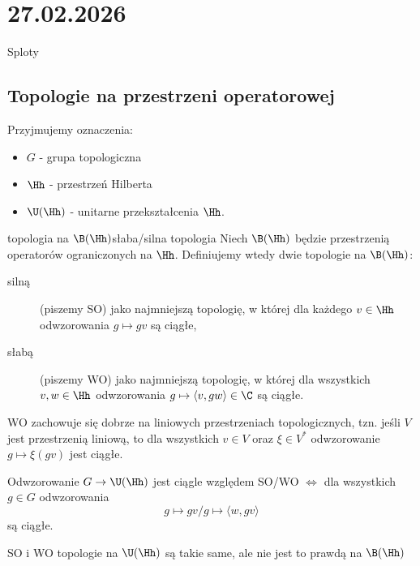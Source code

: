 \section{27.02.2026}{Sploty}

\subsection{Topologie na przestrzeni operatorowej}

Przyjmujemy oznaczenia:
\begin{itemize}
  \item $G$ - grupa topologiczna
  \item $\Hh$ - przestrzeń Hilberta
  \item $\U(\Hh)$ - unitarne przekształcenia $\Hh$.
\end{itemize}

\begin{definition}{topologia na $\B(\Hh)$}{słaba/silna topologia}
  Niech $\B(\Hh)$ będzie przestrzenią operatorów ograniczonych na $\Hh$. Definiujemy wtedy dwie topologie na $\B(\Hh)$:
  \begin{description}
    \item[silną] (piszemy SO) jako najmniejszą topologię, w której dla każdego $v\in\Hh$ odwzorowania $g\mapsto gv$ są ciągłe,
    \item[słabą] (piszemy WO) jako najmniejszą topologię, w której dla wszystkich $v,w\in\Hh$ odwzorowania $g\mapsto \langle v,gw\rangle\in\C$ są ciągłe.
  \end{description}
\end{definition}

WO zachowuje się dobrze na liniowych przestrzeniach topologicznych, tzn. jeśli $V$ jest przestrzenią liniową, to dla wszystkich $v\in V$ oraz $\xi\in V^*$ odwzorowanie $g\mapsto \xi(gv)$ jest ciągłe.

\begin{remark}{}{}
  Odwzorowanie $G\to \U(\Hh)$ jest ciągle względem SO/WO $\iff$ dla wszystkich $g\in G$ odwzorowania 
  $$g\mapsto gv/g\mapsto \langle w,gv\rangle$$ 
  są ciągłe.
\end{remark}

\begin{fact}{}{}
  SO i WO topologie na $\U(\Hh)$ są takie same, ale nie jest to prawdą na $\B(\Hh)$
\end{fact}

